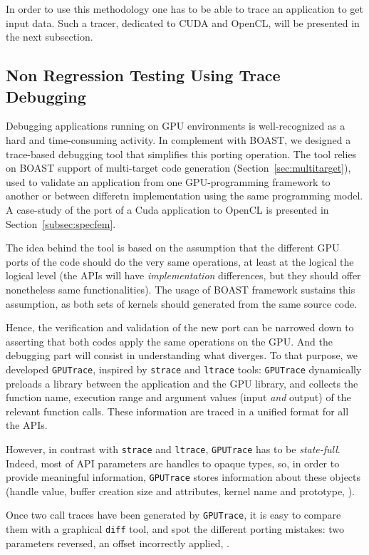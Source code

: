 \documentclass[11pt, a4paper, twoside]{montblanc}
\newcommand{\code}[1]{\texttt{#1}}
\begin{document}
In order to use this methodology one has to be able to trace an application to
get input data. Such a tracer, dedicated to CUDA and OpenCL, will be presented
in the next subsection.

\subsection{Non Regression Testing Using Trace Debugging}
\label{sec:gputrace}

Debugging applications running on GPU environments is well-recognized as a hard
and time-consuming activity. In complement with BOAST, we designed a trace-based
debugging tool that simplifies this porting operation. The tool relies on BOAST
support of multi-target code generation (Section~\ref{sec:multitarget}), used to
validate an application from one GPU-programming framework to another or between
differetn implementation using the same programming model. A case-study of the
port of a Cuda application to OpenCL is presented in
Section~\ref{subsec:specfem}.

The idea behind the tool is based on the assumption that the different
GPU ports of the code should do the very same operations, at least at
the logical the logical level (the APIs will have
\emph{implementation} differences, but they should offer nonetheless
same functionalities). The usage of BOAST framework sustains this
assumption, as both sets of kernels should generated from the same
source code.

Hence, the verification and validation of the new port can be
narrowed down to asserting that both codes apply the same operations
on the GPU. And the debugging part will consist in understanding what
diverges. To that purpose, we developed \code{GPUTrace}, inspired by
\code{strace} and \code{ltrace} tools: \code{GPUTrace} dynamically
preloads a library between the application and the GPU library, and
collects the function name, execution range and argument values (input
\emph{and} output) of the relevant function calls. These information
are traced in a unified format for all the APIs.

However, in contrast with \code{strace} and \code{ltrace},
\code{GPUTrace} has to be \emph{state-full}. Indeed, most of API
parameters are handles to opaque types, so, in order to provide
meaningful information, \code{GPUTrace} stores information about these
objects (handle value, buffer creation size and attributes, kernel
name and prototype, \etc{}).

Once two call traces have been generated by \code{GPUTrace}, it is
easy to compare them with a graphical \code{diff} tool, and spot the
different porting mistakes: two parameters reversed, an offset
incorrectly applied, \etc{}.
\end{document}
